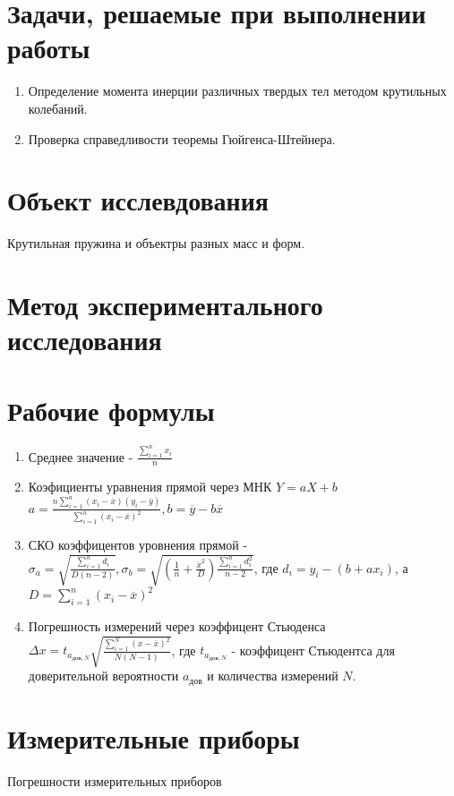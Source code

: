\documentclass[a4paper]{article}
\begin{document}
\section{Задачи, решаемые при выполнении работы}
\begin{enumerate}
    \item Определение момента инерции различных твердых тел методом
крутильных колебаний.
    \item Проверка справедливости теоремы Гюйгенса-Штейнера.
\end{enumerate}

\section{Объект исслевдования}
Крутильная пружина и объектры разных масс и форм.

\section{Метод экспериментального исследования}
 
\section{Рабочие формулы}
\begin{enumerate}
    \item Среднее значение - $\frac{\sum_{i=1}^n x_i}{n}$
    \item Коэфициенты уравнения прямой через МНК $Y = aX + b$ \\ $a = \frac{n \sum_{i=1}^n (x_i - \overline{x})(y_i - \overline{y})}{\sum_{i=1}^n (x_i - \overline{x})^2}, b = \overline{y} - b\overline{x}$
    \item СКО коэффицентов уровнения прямой - $\sigma_a = \sqrt{\frac{\sum_{i=1}^n d_i}{D (n-2)}}, \sigma_b = \sqrt{(\frac{1}{n}+\frac{\overline{x}^2}{D})\frac{\sum_{i = 1}^n d^2_i}{n - 2}}$, где $d_i = y_i - (b + a x_i)$, а $D = \sum_{i=1}^n(x_i -\overline{x})^2$
    \item Погрешность измерений через коэффицент Стьюденса $\Delta x = t_{a_{дов, N}}\sqrt{\frac{\sum\limits_{i=1}^N (x - \bar{x})^2}{N (N-1)}}$, где $t_{a_{дов, N}}$ - коэффицент Стьюдентса для доверительной вероятности $a_{дов}$ и количества измерений $N$.
\end{enumerate}
\section{Измерительные приборы}
$\textbf{Погрешности измерительных приборов}$
\end{document}
